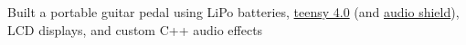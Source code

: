 {Built a portable guitar pedal using LiPo batteries, \href{https://www.pjrc.com/store/teensy40.html}{teensy 4.0} (and \href{https://www.pjrc.com/store/teensy3_audio.html}{audio shield}), LCD displays, and custom C++ audio effects}
